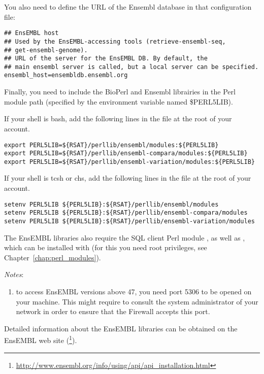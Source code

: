 \documentclass[12pt,a4paper, oneside]{scrreprt} %
\begin{document}
You also need to define the URL of the Ensembl database in that
configuration file:

\begin{lstlisting}
## EnsEMBL host
## Used by the EnsEMBL-accessing tools (retrieve-ensembl-seq,
## get-ensembl-genome).
## URL of the server for the EnsEMBL DB. By default, the
## main ensembl server is called, but a local server can be specified.
ensembl_host=ensembldb.ensembl.org
\end{lstlisting}

Finally, you need to include the BioPerl and Ensembl librairies in the
Perl module path (specified by the environment variable named
\$PERL5LIB).

If your shell is bash, add the following lines in the file
 at the root of your account.

\begin{lstlisting}
export PERL5LIB=${RSAT}/perllib/ensembl/modules:${PERL5LIB}
export PERL5LIB=${RSAT}/perllib/ensembl-compara/modules:${PERL5LIB}
export PERL5LIB=${RSAT}/perllib/ensembl-variation/modules:${PERL5LIB}
\end{lstlisting}

If your shell is tcsh or chs, add the following lines in the file
 at the root of your account.

\begin{lstlisting}
setenv PERL5LIB ${PERL5LIB}:${RSAT}/perllib/ensembl/modules
setenv PERL5LIB ${PERL5LIB}:${RSAT}/perllib/ensembl-compara/modules
setenv PERL5LIB ${PERL5LIB}:${RSAT}/perllib/ensembl-variation/modules
\end{lstlisting}

The EnsEMBL libraries also require the SQL client Perl module
, as well as , which can be installed with
 (for this you need root privileges, see Chapter~\ref{chap:perl_modules}). 

\emph{Notes}: 
\begin{enumerate}
\item to access EnsEMBL versions above 47, you need port 5306 to be
  opened on your machine. This might require to consult the system
  administrator of your network in order to ensure that the Firewall
  accepts this port.
\end{enumerate}

Detailed information about the EnsEMBL libraries can be obtained on
the EnsEMBL web site
(\footnote{\url{http://www.ensembl.org/info/using/api/api\_installation.html}}).
\end{document}
